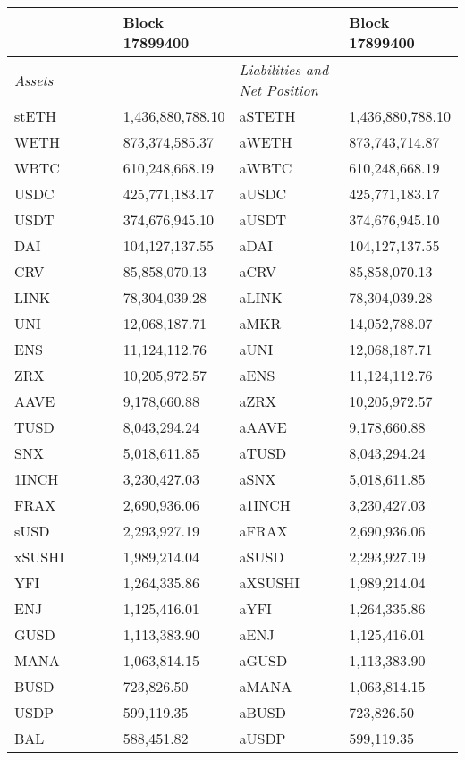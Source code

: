 
\begin{longtable}{@{}p{0.25\linewidth}p{0.25\linewidth}p{0.25\linewidth}p{0.25\linewidth}@{}}

\toprule


& Block 17899400 & & Block 17899400 \\

\midrule
\textit{Assets} & & \textit{Liabilities and Net Position} \\
stETH & 1,436,880,788.10 & aSTETH & 1,436,880,788.10 \\
WETH & 873,374,585.37 & aWETH & 873,743,714.87 \\
WBTC & 610,248,668.19 & aWBTC & 610,248,668.19 \\
USDC & 425,771,183.17 & aUSDC & 425,771,183.17 \\
USDT & 374,676,945.10 & aUSDT & 374,676,945.10 \\
DAI & 104,127,137.55 & aDAI & 104,127,137.55 \\
CRV & 85,858,070.13 & aCRV & 85,858,070.13 \\
LINK & 78,304,039.28 & aLINK & 78,304,039.28 \\
UNI & 12,068,187.71 & aMKR & 14,052,788.07 \\
ENS & 11,124,112.76 & aUNI & 12,068,187.71 \\
ZRX & 10,205,972.57 & aENS & 11,124,112.76 \\
AAVE & 9,178,660.88 & aZRX & 10,205,972.57 \\
TUSD & 8,043,294.24 & aAAVE & 9,178,660.88 \\
SNX & 5,018,611.85 & aTUSD & 8,043,294.24 \\
1INCH & 3,230,427.03 & aSNX & 5,018,611.85 \\
FRAX & 2,690,936.06 & a1INCH & 3,230,427.03 \\
sUSD & 2,293,927.19 & aFRAX & 2,690,936.06 \\
xSUSHI & 1,989,214.04 & aSUSD & 2,293,927.19 \\
YFI & 1,264,335.86 & aXSUSHI & 1,989,214.04 \\
ENJ & 1,125,416.01 & aYFI & 1,264,335.86 \\
GUSD & 1,113,383.90 & aENJ & 1,125,416.01 \\
MANA & 1,063,814.15 & aGUSD & 1,113,383.90 \\
BUSD & 723,826.50 & aMANA & 1,063,814.15 \\
USDP & 599,119.35 & aBUSD & 723,826.50 \\
BAL & 588,451.82 & aUSDP & 599,119.35 \\

\end{longtable}
